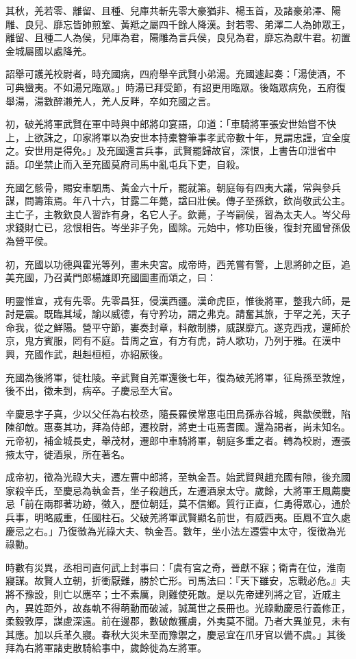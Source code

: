 \begin{pinyinscope}
其秋，羌若零、離留、且種、兒庫共斬先零大豪猶非、楊玉首，及諸豪弟澤、陽雕、良兒、靡忘皆帥煎鞏、黃羝之屬四千餘人降漢。封若零、弟澤二人為帥眾王，離留、且種二人為侯，兒庫為君，陽雕為言兵侯，良兒為君，靡忘為獻牛君。初置金城屬國以處降羌。

詔舉可護羌校尉者，時充國病，四府舉辛武賢小弟湯。充國遽起奏：「湯使酒，不可典蠻夷。不如湯兄臨眾。」時湯已拜受節，有詔更用臨眾。後臨眾病免，五府復舉湯，湯數醉濑羌人，羌人反畔，卒如充國之言。

初，破羌將軍武賢在軍中時與中郎將卬宴語，卬道：「車騎將軍張安世始嘗不快上，上欲誅之，卬家將軍以為安世本持橐簪筆事孝武帝數十年，見謂忠謹，宜全度之。安世用是得免。」及充國還言兵事，武賢罷歸故官，深恨，上書告卬泄省中語。卬坐禁止而入至充國莫府司馬中亂屯兵下吏，自殺。

充國乞骸骨，賜安車駟馬、黃金六十斤，罷就第。朝庭每有四夷大議，常與參兵謀，問籌策焉。年八十六，甘露二年薨，諡曰壯侯。傳子至孫欽，欽尚敬武公主。主亡子，主教欽良人習詐有身，名它人子。欽薨，子岑嗣侯，習為太夫人。岑父母求錢財亡已，忿恨相告。岑坐非子免，國除。元始中，修功臣後，復封充國曾孫伋為營平侯。

初，充國以功德與霍光等列，畫未央宮。成帝時，西羌嘗有警，上思將帥之臣，追美充國，乃召黃門郎楊雄即充國圖畫而頌之，曰：

明靈惟宣，戎有先零。先零昌狂，侵漢西疆。漢命虎臣，惟後將軍，整我六師，是討是震。既臨其域，諭以威德，有守矜功，謂之弗克。請奮其旅，于罕之羌，天子命我，從之鮮陽。營平守節，婁奏封章，料敵制勝，威謀靡亢。遂克西戎，還師於京，鬼方賓服，罔有不庭。昔周之宣，有方有虎，詩人歌功，乃列于雅。在漢中興，充國作武，赳赳桓桓，亦紹厥後。

充國為後將軍，徙杜陵。辛武賢自羌軍還後七年，復為破羌將軍，征烏孫至敦煌，後不出，徵未到，病卒。子慶忌至大官。

辛慶忌字子真，少以父任為右校丞，隨長羅侯常惠屯田烏孫赤谷城，與歙侯戰，陷陳卻敵。惠奏其功，拜為侍郎，遷校尉，將吏士屯焉耆國。還為謁者，尚未知名。元帝初，補金城長史，舉茂材，遷郎中車騎將軍，朝庭多重之者。轉為校尉，遷張掖太守，徙酒泉，所在著名。

成帝初，徵為光祿大夫，遷左曹中郎將，至執金吾。始武賢與趙充國有隙，後充國家殺辛氏，至慶忌為執金吾，坐子殺趙氏，左遷酒泉太守。歲餘，大將軍王鳳薦慶忌「前在兩郡著功跡，徵入，歷位朝廷，莫不信鄉。質行正直，仁勇得眾心，通於兵事，明略威重，任國柱石。父破羌將軍武賢顯名前世，有威西夷。臣鳳不宜久處慶忌之右。」乃復徵為光祿大夫、執金吾。數年，坐小法左遷雲中太守，復徵為光祿勳。

時數有災異，丞相司直何武上封事曰：「虞有宮之奇，晉獻不寐；衛青在位，淮南寢謀。故賢人立朝，折衝厭難，勝於亡形。司馬法曰：『天下雖安，忘戰必危。』夫將不豫設，則亡以應卒；士不素厲，則難使死敵。是以先帝建列將之官，近戚主內，異姓距外，故姦軌不得萌動而破滅，誠萬世之長冊也。光祿勳慶忌行義修正，柔毅敦厚，謀慮深遠。前在邊郡，數破敵獲虜，外夷莫不聞。乃者大異並見，未有其應。加以兵革久寢。春秋大災未至而豫禦之，慶忌宜在爪牙官以備不虞。」其後拜為右將軍諸吏散騎給事中，歲餘徙為左將軍。


\end{pinyinscope}
